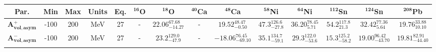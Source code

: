 \bgroup
\def\arraystretch{1.5}%
\begin{tabular}{ c c c c c c c c c c c c c c} 
\textbf{Par.} & \textbf{Min} & \textbf{Max} &                \textbf{Units} & \textbf{Eq.}& \textbf{$\mathbf{^{16}}$O}& \textbf{$\mathbf{^{18}}$O}& \textbf{$\mathbf{^{40}}$Ca}& \textbf{$\mathbf{^{48}}$Ca}& \textbf{$\mathbf{^{58}}$Ni}& \textbf{$\mathbf{^{64}}$Ni}& \textbf{$\mathbf{^{112}}$Sn}& \textbf{$\mathbf{^{124}}$Sn}& \textbf{$\mathbf{^{208}}$Pb}\\
 \hline 
$\mathbf{A_{vol,asym}^{+}}$ & -100 & 200 & MeV & 27 & -  & $22.06^{67.68}_{-14.27}$ & - & $19.52^{48.47}_{-0.50}$ & $47.3^{126.6}_{-27.8}$ & $36.20^{78.45}_{5.71}$ & $54.2^{117.8}_{21.3}$ & $32.42^{77.36}_{5.64}$ & $19.76^{33.88}_{10.10}$\\ 
$\mathbf{A_{vol,asym}^{-}}$ & -100 & 200 & MeV & 27 & -  & $23.2^{129.0}_{-47.9}$ & - & $-18.06^{76.45}_{-69.10}$ & $35.1^{134.7}_{-59.1}$ & $29.3^{122.0}_{-53.6}$ & $15.3^{125.2}_{-58.2}$ & $19.00^{96.42}_{-43.70}$ & $19.81^{82.91}_{-44.40}$\\ 
\\ 
\end{tabular}
\egroup